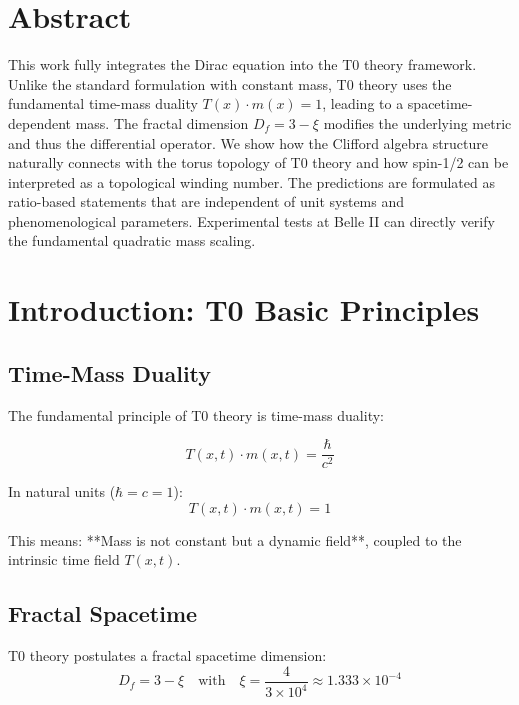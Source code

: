 \section*{Abstract}
		This work fully integrates the Dirac equation into the T0 theory framework. 
		Unlike the standard formulation with constant mass, T0 theory uses the fundamental 
		time-mass duality $T(x) \cdot m(x) = 1$, leading to a spacetime-dependent mass. 
		The fractal dimension $D_f = 3 - \xi$ modifies the underlying metric and thus 
		the differential operator. We show how the Clifford algebra structure naturally 
		connects with the torus topology of T0 theory and how spin-1/2 can be interpreted 
		as a topological winding number. The predictions are formulated as ratio-based 
		statements that are independent of unit systems and phenomenological parameters. 
		Experimental tests at Belle II can directly verify the fundamental quadratic mass scaling.

	
	
	\section{Introduction: T0 Basic Principles}
	
	\subsection{Time-Mass Duality}
	
	The fundamental principle of T0 theory is time-mass duality:
	
	\begin{equation}
		T(x,t) \cdot m(x,t) = \frac{\hbar}{c^2}
		\label{eq:time_mass_duality}
	\end{equation}
	
	In natural units ($\hbar = c = 1$):
	\begin{equation}
		T(x,t) \cdot m(x,t) = 1
		\label{eq:tmd_natural}
	\end{equation}
	
	This means: **Mass is not constant but a dynamic field**, coupled to the intrinsic time field $T(x,t)$.
	
	\subsection{Fractal Spacetime}
	
	T0 theory postulates a fractal spacetime dimension:
	\begin{equation}
		D_f = 3 - \xi \quad \text{with} \quad \xi = \frac{4}{3 \times 10^4} \approx 1.333 \times 10^{-4}
		\label{eq:fractal_dim}
	\end{equation}
	
